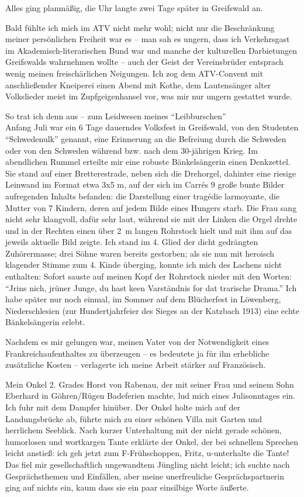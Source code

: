 \documentclass[a5paper,pagesize,10pt,twoside=true]{scrbook}
\begin{document}
Alles ging planmäßig, die Uhr langte zwei Tage später in Greifswald an.

Bald fühlte ich mich im ATV nicht mehr wohl; nicht nur die Beschränkung meiner persönlichen Freiheit war es -- man sah es ungern, dass ich Verkehrsgast im Akademisch-literarischen Bund war und manche der kulturellen Darbietungen Greifswalds wahrnehmen wollte -- auch der Geist der Vereinsbrüder entsprach wenig meinen freischärlichen Neigungen. Ich zog dem ATV-Convent mit anschließender Kneiperei einen Abend mit Kothe, dem Lautensänger alter Volkslieder meist im Zupfgeigenhansel vor, was mir nur ungern gestattet wurde.

So trat ich denn aus -- zum Leidwesen meines \enquote{Leibburschen}\\

Anfang Juli war ein 6 Tage dauerndes Volksfest in Greifswald, von den Studenten \enquote{Schwedenulk} genannt, eine Erinnerung an die Befreiung durch die Schweden oder von den Schweden während bzw. nach dem 30-jährigen Krieg. Im abendlichen Rummel erteilte mir eine robuste Bänkelsängerin einen Denkzettel. Sie stand auf einer Bretterestrade, neben sich die Drehorgel, dahinter eine riesige Leinwand im Format etwa 3x5 m, auf der sich im Carrés 9 große bunte Bilder aufregenden Inhalts befanden: die Darstellung einer tragédie larmoyante, die Mutter von 7 Kindern, deren auf jedem Bilde eines Hungers starb. Die Frau sang nicht sehr klangvoll, dafür sehr laut, während sie mit der Linken die Orgel drehte und in der Rechten einen über 2~m langen Rohrstock hielt und mit ihm auf das jeweils aktuelle Bild zeigte. Ich stand im 4. Glied der dicht gedrängten Zuhörermasse; drei Söhne waren bereits gestorben; als sie nun mit heroisch klagender Stimme zum 4. Kinde überging, konnte ich mich des Lachens nicht enthalten: Sofort sauste auf meinen Kopf der Rohrstock nieder mit den Worten: \enquote{Jrins nich, jrüner Junge, du hast keen Varständnis for dat trarische Drama.}
Ich habe später nur noch einmal, im Sommer auf dem Blücherfest in Löwenberg, Niederschlesien (zur Hundertjahrfeier des Sieges an der Katzbach 1913) eine echte Bänkelsängerin erlebt.

Nachdem es mir gelungen war, meinen Vater von der Notwendigkeit eines Frankreichaufenthaltes zu überzeugen -- es bedeutete ja für ihn erhebliche zusätzliche Kosten -- verlagerte ich meine Arbeit stärker auf Französisch.

Mein Onkel 2. Grades Horst von Rabenau, der mit seiner Frau und seinem Sohn Eberhard in Göhren/Rügen Badeferien machte, lud mich eines Julisonntages ein. Ich fuhr mit dem Dampfer hinüber. Der Onkel holte mich auf der Landungsbrücke ab, führte mich zu einer schönen Villa mit Garten und herrlichem Seeblick. Nach kurzer Unterhaltung mit der nicht gerade schönen, humorlosen und wortkargen Tante erklärte der Onkel, der bei schnellem Sprechen leicht anstieß: ich geh jetzt zum F-Frühschoppen, Fritz, u-unterhalte die Tante! Das fiel mir gesellschaftlich ungewandtem Jüngling nicht leicht; ich suchte nach Gesprächsthemen und Einfällen, aber meine unerfreuliche Gesprächspartnerin ging auf nichts ein, kaum dass sie ein paar einsilbige Worte äußerte.
\end{document}
